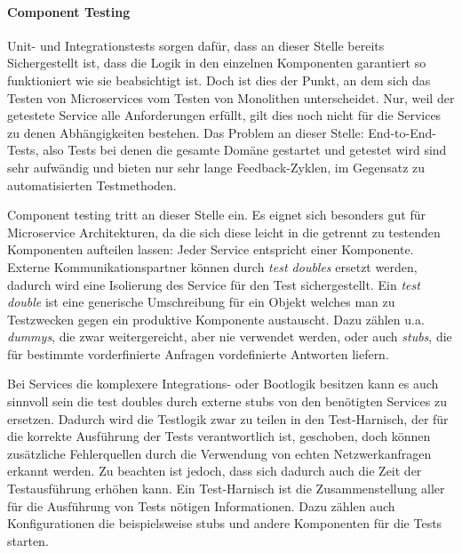 \documentclass[12pt,a4paper,bibliography=totocnumbered,listof=totocnumbered]{scrartcl}
\begin{document}

\paragraph{Component Testing}

Unit- und Integrationstests sorgen dafür, dass an dieser Stelle bereits Sichergestellt ist, dass die Logik in den einzelnen Komponenten garantiert so funktioniert wie sie beabsichtigt ist. Doch ist dies der Punkt, an dem sich das Testen von Microservices vom Testen von Monolithen unterscheidet. Nur, weil der getestete Service alle Anforderungen erfüllt, gilt dies noch nicht für die Services zu denen Abhängigkeiten bestehen.
Das Problem an dieser Stelle: End-to-End-Tests, also Tests bei denen die gesamte Domäne gestartet und getestet wird sind sehr aufwändig und bieten nur sehr lange Feedback-Zyklen, im Gegensatz zu automatisierten Testmethoden.\cite{clemson}

Component testing tritt an dieser Stelle ein. Es eignet sich besonders gut für Microservice Architekturen, da die sich diese leicht in die getrennt zu testenden Komponenten aufteilen lassen: Jeder Service entspricht einer Komponente. Externe Kommunikationspartner können durch \textit{test doubles} ersetzt werden, dadurch wird eine Isolierung des Service für den Test sichergestellt.\cite{clemson} Ein \textit{test double} ist eine generische Umschreibung für ein Objekt welches man zu Testzwecken gegen ein produktive Komponente austauscht. Dazu zählen u.a. \textit{dummys}, die zwar weitergereicht, aber nie verwendet werden, oder auch \textit{stubs}, die für bestimmte vorderfinierte Anfragen vordefinierte Antworten liefern.\cite{fowlertestdouble}


Bei Services die komplexere Integrations- oder Bootlogik besitzen kann es auch sinnvoll sein die test doubles durch externe stubs von den benötigten Services zu ersetzen. Dadurch wird die Testlogik zwar zu teilen in den Test-Harnisch, der für die korrekte Ausführung der Tests verantwortlich ist, geschoben, doch können zusätzliche Fehlerquellen durch die Verwendung von echten Netzwerkanfragen erkannt werden. Zu beachten ist jedoch, dass sich dadurch auch die Zeit der Testausführung erhöhen kann.\cite{clemson} Ein Test-Harnisch ist die Zusammenstellung aller für die Ausführung von Tests nötigen Informationen. Dazu zählen auch Konfigurationen die beispielsweise stubs und andere Komponenten für die Tests starten.
\end{document}
